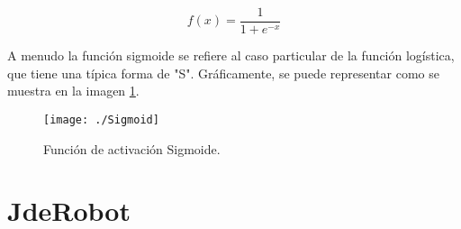\documentclass[a4paper, 12pt, spanish, chapterprefix, numbers=noenddot]{book}
\begin{document}
\begin{itemize}
\begin{equation}
f(x)=\frac{1}{1 + e ^ {-x}}
\end{equation}

A menudo la función sigmoide se refiere al caso particular de la función logística, que tiene una típica forma de "S". Gráficamente, se puede representar como se muestra en la imagen \ref{Sigmoid}.

\begin{figure}[H]
\begin{center}
\texttt{[image: ./Sigmoid]}
\caption{Función de activación Sigmoide.}
\label{Sigmoid}
\end{center}
\end{figure}

\begin{comment}
\item \textbf{TanH}
\item \textbf{Absolute Value}
\item \textbf{Power} 

\begin{equation}
f(x) = (shift + scale * x) ^ {power}
\end{equation}}

\item \textbf{Exp}

\begin{equation}
f(x) = base ^ {(shift + scale * x)}
\end{equation}
\item \textbf{Log}

\begin{equation}
f(x) = log(x)
\end{equation}
\item \textbf{BNLL}

\begin{equation}
f(x) = log(1 + exp(x))
\end{equation}

\item \textbf{Threshold}: Realiza la función de paso en el umbral definido por el usuario.
\item \textbf{Bias} 
\item \textbf{Scale}
\end{comment}
\end{itemize}

\section{JdeRobot}
\end{document}
